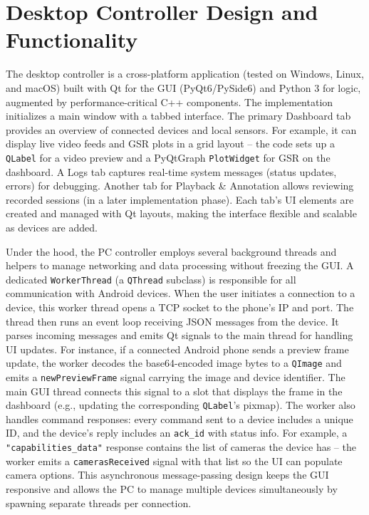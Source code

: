 \section{Desktop Controller Design and Functionality}\label{sec:4-3}
The desktop controller is a cross-platform application (tested on Windows, Linux, and macOS) built with Qt for the GUI (PyQt6/PySide6) \cite{ref17} and Python 3 for logic, augmented by performance-critical C++ components. The implementation initializes a main window with a tabbed interface. The primary Dashboard tab provides an overview of connected devices and local sensors. For example, it can display live video feeds and GSR plots in a grid layout -- the code sets up a \texttt{QLabel} for a video preview and a PyQtGraph \texttt{PlotWidget} for GSR on the dashboard. A Logs tab captures real-time system messages (status updates, errors) for debugging. Another tab for Playback \& Annotation allows reviewing recorded sessions (in a later implementation phase). Each tab's UI elements are created and managed with Qt layouts, making the interface flexible and scalable as devices are added.

Under the hood, the PC controller employs several background threads and helpers to manage networking and data processing without freezing the GUI. A dedicated \texttt{WorkerThread} (a \texttt{QThread} subclass) is responsible for all communication with Android devices. When the user initiates a connection to a device, this worker thread opens a TCP socket to the phone's IP and port. The thread then runs an event loop receiving JSON messages from the device. It parses incoming messages and emits Qt signals to the main thread for handling UI updates. For instance, if a connected Android phone sends a preview frame update, the worker decodes the base64-encoded image bytes to a \texttt{QImage} and emits a \texttt{newPreviewFrame} signal carrying the image and device identifier. The main GUI thread connects this signal to a slot that displays the frame in the dashboard (e.g., updating the corresponding \texttt{QLabel}'s pixmap). The worker also handles command responses: every command sent to a device includes a unique ID, and the device's reply includes an \texttt{ack\_id} with status info. For example, a \texttt{"capabilities\_data"} response contains the list of cameras the device has -- the worker emits a \texttt{camerasReceived} signal with that list so the UI can populate camera options. This asynchronous message-passing design keeps the GUI responsive and allows the PC to manage multiple devices simultaneously by spawning separate threads per connection.

